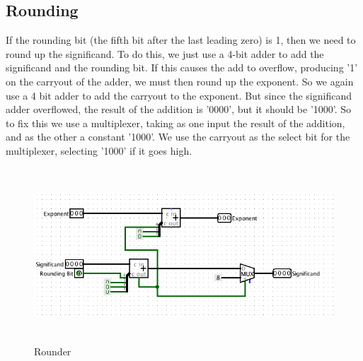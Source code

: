 \documentclass[paper=letter, fontsize=11pt]{scrartcl}
\begin{document}
\subsection{Rounding}
If the rounding bit (the fifth bit after the last leading zero) is 1, then we need to round up the significand. To do this, we just use a 4-bit adder to add the significand and the rounding bit. If this causes the add to overflow, producing '1' on the carryout of the adder, we must then round up the exponent. So we again use a 4 bit adder to add the carryout to the exponent. But since the significand adder overflowed, the result of the addition is '0000', but it should be '1000'. So to fix this we use a multiplexer, taking as one input the result of the addition, and as the other a constant '1000'. We use the carryout as the select bit for the multiplexer, selecting '1000' if it goes high.
\begin{figure}[H]
\includegraphics[height=65mm]{round.png}
\centering
\caption{Rounder}
\label{overflow}
\end{figure}

\end{document}
